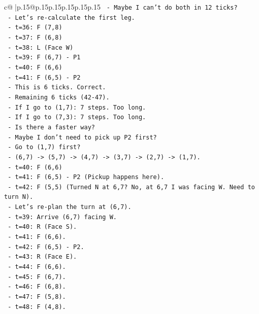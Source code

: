 \documentclass{article}
\begin{document}
{\begin{supertabular}{c@{$\;$}|p{.15\linewidth}@{}p{.15\linewidth}p{.15\linewidth}p{.15\linewidth}p{.15\linewidth}p{.15\linewidth}}
{{{\texttt{    {-} Maybe I can't do both in 12 ticks?} \\
\texttt{    {-} Let's re{-}calculate the first leg.} \\
\texttt{      {-} t=36: F (7,8)} \\
\texttt{      {-} t=37: F (6,8)} \\
\texttt{      {-} t=38: L (Face W)} \\
\texttt{      {-} t=39: F (6,7) {-} P1} \\
\texttt{      {-} t=40: F (6,6)} \\
\texttt{      {-} t=41: F (6,5) {-} P2} \\
\texttt{      {-} This is 6 ticks. Correct.} \\
\texttt{    {-} Remaining 6 ticks (42{-}47).} \\
\texttt{    {-} If I go to (1,7): 7 steps. Too long.} \\
\texttt{    {-} If I go to (7,3): 7 steps. Too long.} \\
\texttt{    {-} Is there a faster way?} \\
\texttt{    {-} Maybe I don't need to pick up P2 first?} \\
\texttt{    {-} Go to (1,7) first?} \\
\texttt{      {-} (6,7) {-}> (5,7) {-}> (4,7) {-}> (3,7) {-}> (2,7) {-}> (1,7).} \\
\texttt{      {-} t=40: F (6,6)} \\
\texttt{      {-} t=41: F (6,5) {-} P2 (Pickup happens here).} \\
\texttt{      {-} t=42: F (5,5) (Turned N at 6,7? No, at 6,7 I was facing W. Need to turn N).} \\
\texttt{      {-} Let's re{-}plan the turn at (6,7).} \\
\texttt{      {-} t=39: Arrive (6,7) facing W.} \\
\texttt{      {-} t=40: R (Face S).} \\
\texttt{      {-} t=41: F (6,6).} \\
\texttt{      {-} t=42: F (6,5) {-} P2.} \\
\texttt{      {-} t=43: R (Face E).} \\
\texttt{      {-} t=44: F (6,6).} \\
\texttt{      {-} t=45: F (6,7).} \\
\texttt{      {-} t=46: F (6,8).} \\
\texttt{      {-} t=47: F (5,8).} \\
\texttt{      {-} t=48: F (4,8).} \\
}}}
\end{supertabular}}
\end{document}
